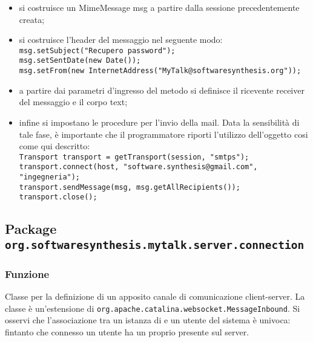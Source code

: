\begin{description}
\begin{itemize}
	\item si costruisce un MimeMessage msg a partire dalla sessione precedentemente creata;
	\item si costruisce l'header del messaggio nel seguente modo:\\
	
		\verb|msg.setSubject("Recupero password");|\\
	    \verb|msg.setSentDate(new Date());|\\
	    \verb|msg.setFrom(new InternetAddress("MyTalk@softwaresynthesis.org"));|\\
	\item a partire dai parametri d'ingresso del metodo si definisce il ricevente receiver del messaggio e il corpo text;
	\item infine si impostano le procedure per l'invio della mail. Data la sensibilità di tale fase, è importante che il programmatore riporti l'utilizzo dell'oggetto  cosi come qui descritto:\\
	
		\verb|Transport transport = getTransport(session, "smtps");|\\
		\verb|transport.connect(host, "software.synthesis@gmail.com", "ingegneria");|\\
		\verb|transport.sendMessage(msg, msg.getAllRecipients());|\\
		\verb|transport.close();|
\end{itemize}

\end{description}

\subsection{Package \texttt{org.softwaresynthesis.mytalk.server.connection}}\label{sec:connection}


\subsubsection*{Funzione}
Classe per la definizione di un apposito canale di comunicazione client-server. La classe è un'estensione di \texttt{org.apache.catalina.websocket.MessageInbound}. Si osservi che l'associazione tra un istanza di  e un utente del sistema è univoca: fintanto che connesso un utente ha un proprio  presente sul server.

